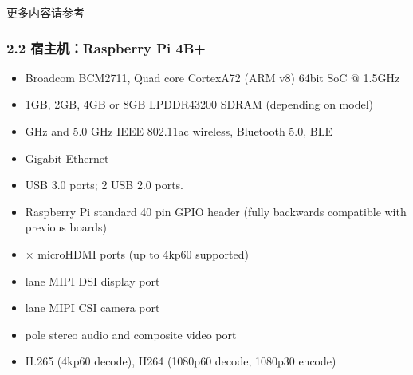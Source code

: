 \documentclass[a4paper,12pt,english]{sphinxmanual}
\begin{document}
\sphinxAtStartPar
{}

\sphinxAtStartPar
{}

\sphinxAtStartPar
{}

\sphinxAtStartPar
{}

\sphinxAtStartPar
更多内容请参考


\subsubsection{2.2 宿主机：Raspberry Pi 4B+}
\label{\detokenize{dev-board/arch:raspberry-pi-4b}}
\sphinxAtStartPar
{}
\begin{itemize}
\item {} 
\sphinxAtStartPar
Broadcom BCM2711, Quad core Cortex\sphinxhyphen{}A72 (ARM v8) 64\sphinxhyphen{}bit SoC @ 1.5GHz

\item {} 
\sphinxAtStartPar
1GB, 2GB, 4GB or 8GB LPDDR4\sphinxhyphen{}3200 SDRAM (depending on model)

\item {} 
 GHz and 5.0 GHz IEEE 802.11ac wireless, Bluetooth 5.0, BLE

\item {} 
\sphinxAtStartPar
Gigabit Ethernet

\item {} 
 USB 3.0 ports; 2 USB 2.0 ports.

\item {} 
\sphinxAtStartPar
Raspberry Pi standard 40 pin GPIO header (fully backwards compatible with previous boards)

\item {} 
 × micro\sphinxhyphen{}HDMI ports (up to 4kp60 supported)

\item {} 
\sphinxhyphen{}lane MIPI DSI display port

\item {} 
\sphinxhyphen{}lane MIPI CSI camera port

\item {} 
\sphinxhyphen{}pole stereo audio and composite video port

\item {} 
\sphinxAtStartPar
H.265 (4kp60 decode), H264 (1080p60 decode, 1080p30 encode)


\end{itemize}
\end{document}
